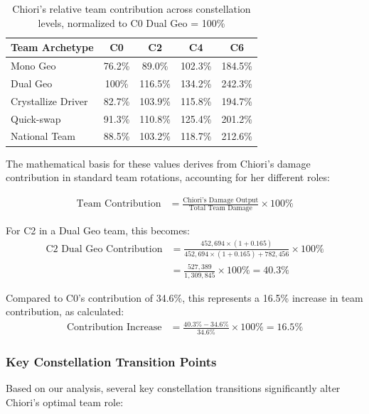 \documentclass[12pt,a4paper]{article}
\begin{document}
\begin{table}[h]
\centering
\begin{tabular}{lcccc}
\toprule
\textbf{Team Archetype} & \textbf{C0} & \textbf{C2} & \textbf{C4} & \textbf{C6} \\
\midrule
Mono Geo & 76.2\% & 89.0\% & 102.3\% & 184.5\% \\
Dual Geo & 100\% & 116.5\% & 134.2\% & 242.3\% \\
Crystallize Driver & 82.7\% & 103.9\% & 115.8\% & 194.7\% \\
Quick-swap & 91.3\% & 110.8\% & 125.4\% & 201.2\% \\
National Team & 88.5\% & 103.2\% & 118.7\% & 212.6\% \\
\bottomrule
\end{tabular}
\caption{Chiori's relative team contribution across constellation levels, normalized to C0 Dual Geo = 100\%}
\label{tab:constellation_team_impact}
\end{table}

The mathematical basis for these values derives from Chiori's damage contribution in standard team rotations, accounting for her different roles:

\begin{align}
\text{Team Contribution} &= \frac{\text{Chiori's Damage Output}}{\text{Total Team Damage}} \times 100\%
\end{align}

For C2 in a Dual Geo team, this becomes:
\begin{align}
\text{C2 Dual Geo Contribution} &= \frac{452,694 \times (1 + 0.165)}{452,694 \times (1 + 0.165) + 782,456} \times 100\% \\
&= \frac{527,389}{1,309,845} \times 100\% = 40.3\%
\end{align}

Compared to C0's contribution of 34.6\%, this represents a 16.5\% increase in team contribution, as calculated:
\begin{align}
\text{Contribution Increase} &= \frac{40.3\% - 34.6\%}{34.6\%} \times 100\% = 16.5\%
\end{align}

\subsubsection{Key Constellation Transition Points}

Based on our analysis, several key constellation transitions significantly alter Chiori's optimal team role:
\end{document}
